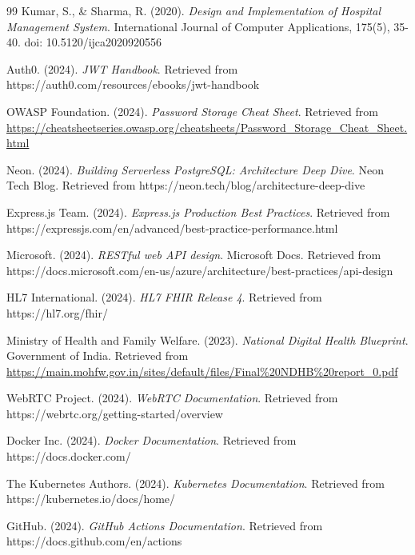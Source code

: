 \begin{thebibliography}{99}
Kumar, S., \& Sharma, R. (2020). \textit{Design and Implementation of Hospital Management System}. International Journal of Computer Applications, 175(5), 35-40. doi: 10.5120/ijca2020920556

Auth0. (2024). \textit{JWT Handbook}. Retrieved from https://auth0.com/resources/ebooks/jwt-handbook

OWASP Foundation. (2024). \textit{Password Storage Cheat Sheet}. Retrieved from \url{https://cheatsheetseries.owasp.org/cheatsheets/Password_Storage_Cheat_Sheet.html}

Neon. (2024). \textit{Building Serverless PostgreSQL: Architecture Deep Dive}. Neon Tech Blog. Retrieved from https://neon.tech/blog/architecture-deep-dive

Express.js Team. (2024). \textit{Express.js Production Best Practices}. Retrieved from https://expressjs.com/en/advanced/best-practice-performance.html

Microsoft. (2024). \textit{RESTful web API design}. Microsoft Docs. Retrieved from https://docs.microsoft.com/en-us/azure/architecture/best-practices/api-design

HL7 International. (2024). \textit{HL7 FHIR Release 4}. Retrieved from https://hl7.org/fhir/

Ministry of Health and Family Welfare. (2023). \textit{National Digital Health Blueprint}. Government of India. Retrieved from \url{https://main.mohfw.gov.in/sites/default/files/Final\%20NDHB\%20report_0.pdf}

WebRTC Project. (2024). \textit{WebRTC Documentation}. Retrieved from https://webrtc.org/getting-started/overview

Docker Inc. (2024). \textit{Docker Documentation}. Retrieved from https://docs.docker.com/

The Kubernetes Authors. (2024). \textit{Kubernetes Documentation}. Retrieved from https://kubernetes.io/docs/home/

GitHub. (2024). \textit{GitHub Actions Documentation}. Retrieved from https://docs.github.com/en/actions


\end{thebibliography}
